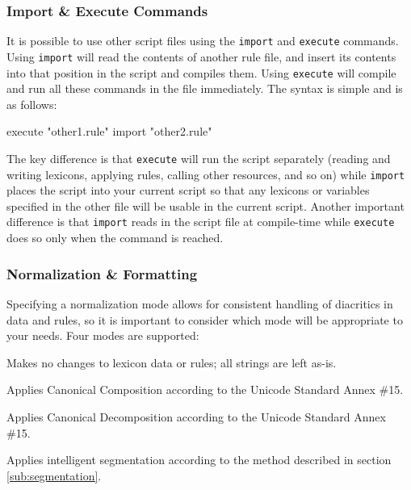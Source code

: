 \documentclass[10pt,letterpaper]{article}
\newcounter{excounter}
\newenvironment{vex}[1]{
  \vspace{1em}
  \refstepcounter{excounter}
  \noindent\makebox[3em][l]{(\arabic{excounter}\label{#1})}
  \minipage{\textwidth}
  \verbatim
}{
  \endverbatim
  \endminipage
  \vspace{1em}
}
\begin{document}
\subsubsection{Import \& Execute Commands}
\label{ssub:import_and_execute_commands}
It is possible to use other script files using the \texttt{import} and \texttt{execute} commands. Using \texttt{import} will read the contents of another rule file, and insert its contents into that position in the script and compiles them. Using \texttt{execute} will compile and run all these commands in the file immediately. The syntax is simple and is as follows:

\begin{vex}{ex:commands}
execute "other1.rule"
import  "other2.rule"
\end{vex}

\noindent
The key difference is that \texttt{execute} will run the script separately (reading and writing lexicons, applying rules, calling other resources, and so on) while \texttt{import} places the script into your current script so that any lexicons or variables specified in the other file will be usable in the current script. Another important difference is that \texttt{import} reads in the script file at compile-time while \texttt{execute} does so only when the command is reached.


\subsubsection{Normalization \& Formatting}
\label{ssub:normalization_and_formatting}
Specifying a normalization mode allows for consistent handling of diacritics in data and rules, so it is important to consider which mode will be appropriate to your needs. Four modes are supported:

\begin{description}
\itemsep1pt \parskip0pt  
\item[\texttt{none}] Makes no changes to lexicon data or rules; all strings are left as-is.
\item[\texttt{composition}] Applies Canonical Composition according to the Unicode Standard Annex \#15.
\item[\texttt{decomposition}] Applies Canonical Decomposition according to the Unicode Standard Annex \#15.
\item[\texttt{intelligent}] Applies intelligent segmentation according to the method described in section \ref{sub:segmentation}.
\end{description} 
\end{document}
